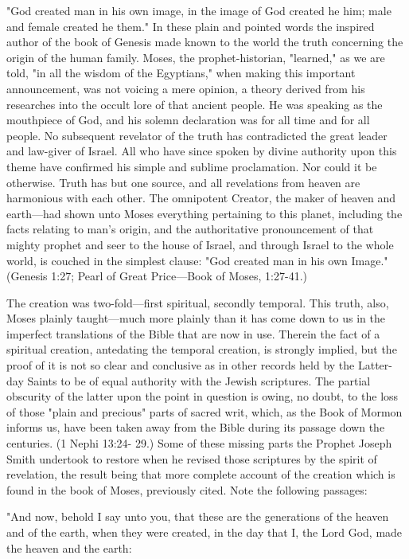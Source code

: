 "God created man in his own image, in the image of God created he him; male and female
created he them." In these plain and pointed words the inspired author of the book of Genesis
made known to the world the truth concerning the origin of the human family. Moses, the
prophet-historian, "learned," as we are told, "in all the wisdom of the Egyptians," when
making this important announcement, was not voicing a mere opinion, a theory derived from
his researches into the occult lore of that ancient people. He was speaking as the mouthpiece
of God, and his solemn declaration was for all time and for all people. No subsequent
revelator of the truth has contradicted the great leader and law-giver of Israel. All who have
since spoken by divine authority upon this theme have confirmed his simple and sublime
proclamation. Nor could it be otherwise. Truth has but one source, and all revelations from
heaven are harmonious with each other. The omnipotent Creator, the maker of heaven and
earth—had shown unto Moses everything pertaining to this planet, including the facts
relating to man's origin, and the authoritative pronouncement of that mighty prophet and seer
to the house of Israel, and through Israel to the whole world, is couched in the simplest
clause: "God created man in his own Image." (Genesis 1:27; Pearl of Great Price—Book of
Moses, 1:27-41.)

The creation was two-fold—first spiritual, secondly temporal. This truth, also, Moses plainly
taught—much more plainly than it has come down to us in the imperfect translations of the
Bible that are now in use. Therein the fact of a spiritual creation, antedating the temporal
creation, is strongly implied, but the proof of it is not so clear and conclusive as in other
records held by the Latter-day Saints to be of equal authority with the Jewish scriptures. The
partial obscurity of the latter upon the point in question is owing, no doubt, to the loss of
those "plain and precious" parts of sacred writ, which, as the Book of Mormon informs us,
have been taken away from the Bible during its passage down the centuries. (1 Nephi 13:24-
29.) Some of these missing parts the Prophet Joseph Smith undertook to restore when he
revised those scriptures by the spirit of revelation, the result being that more complete
account of the creation which is found in the book of Moses, previously cited. Note the
following passages:

"And now, behold I say unto you, that these are the generations of the heaven and of the
earth, when they were created, in the day that I, the Lord God, made the heaven and the
earth:

